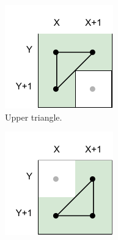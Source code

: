 \begin{figure}[ht]
    \centering
    
    \begin{subfigure}{0.3\textwidth}
        \includegraphics[width=\textwidth]{triangles-upper.pdf}
        \caption{Upper triangle.}
        \label{fig:triangle_generation:upper}
    \end{subfigure}
    \begin{subfigure}{0.3\textwidth}
        \includegraphics[width=\textwidth]{triangles-lower.pdf}

\end{subfigure}
\end{figure}

